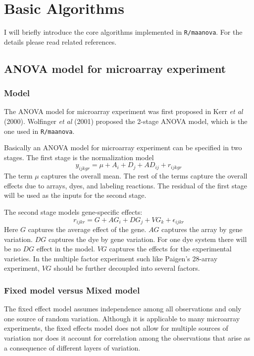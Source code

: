 
\newpage

\section{Basic Algorithms}

I will briefly introduce the core 
algorithms implemented
in {\tt R/maanova}. For the details please read related
references. 

\subsection{ANOVA model for microarray experiment}

\subsubsection{Model}
The ANOVA model for microarray experiment was first proposed 
in Kerr {\it et al} (2000). Wolfinger {\it et al} (2001)
proposed the 2-stage ANOVA model, which is the one used
in {\tt R/maanova}. 

Basically an ANOVA model for 
microarray experiment can be specified in two stages.
The first stage is the normalization model
\begin{equation}
y_{ijkgr} = \mu + A_i + D_j + AD_{ij} + r_{ijkgr}
\end{equation}
The term $\mu$ captures the overall mean. The rest of the terms
capture the overall effects 
due to arrays, dyes, and labeling reactions. The residual 
of the first stage will be used as the inputs for the second stage.

The second stage models gene-specific effects:
\begin{equation}
r_{ijkr} = G + AG_i + DG_j + VG_k + \epsilon_{ijkr}
\end{equation}
Here $G$ captures the average effect of the gene. $AG$ captures
the array by gene variation. $DG$ captures the dye by gene variation. 
For one dye system there will be no $DG$ effect in the model.
$VG$ captures the effects for the experimental varieties. In the
multiple factor experiment such like Paigen's 28-array experiment, 
$VG$ should be further decoupled into several factors. 

\subsubsection{Fixed model versus Mixed model}
The fixed effect model assumes independence among all 
observations and only one source of random variation.  
Although it is applicable to many microarray experiments, 
the fixed effects model does not allow for multiple sources
of variation nor does it account for correlation among 
the observations that arise as a consequence of different 
layers of variation. 

